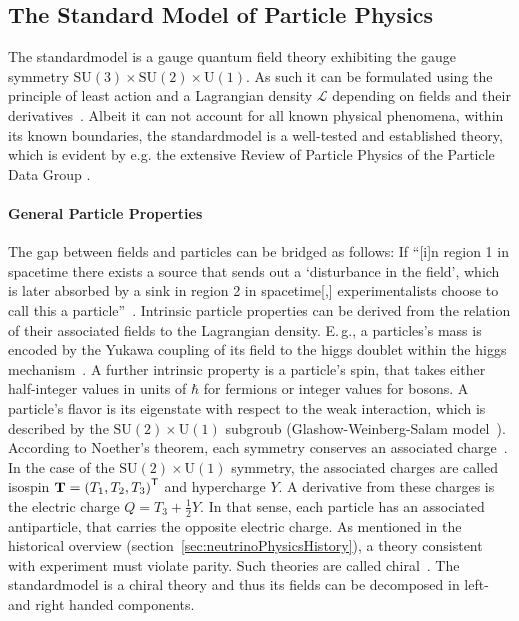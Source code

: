 \subsection{The Standard Model of Particle Physics}
\label{sec:neutrinoPhysicsStandardModelParticleProperties}
The \gls{standardmodel} is a gauge quantum field theory exhibiting the gauge symmetry $\text{SU}(3)\times\text{SU}(2)\times\text{U}(1)$. As such it can be formulated using the principle of least action and a Lagrangian density $\mathcal{L}$ depending on fields and their derivatives~\cite{zee2003quantum}. Albeit it can not account for all known physical phenomena, within its known boundaries, the \gls{standardmodel} is a well-tested and established theory, which is evident by e.g. the extensive Review of Particle Physics of the Particle Data Group \cite{ReviewOfParticlePhysics}.

\paragraph{General Particle Properties}
The gap between fields and particles can be bridged as follows: If ``[i]n region 1 in spacetime there exists a source that sends out a `disturbance in the field', which is later absorbed by a sink in region 2 in spacetime[,] experimentalists choose to call this a particle''~\cite{zee2003quantum}. Intrinsic particle properties can be derived from the relation of their associated fields to the Lagrangian density. E.\,g., a particles's mass is encoded by the Yukawa coupling of its field to the higgs doublet within the higgs mechanism~\cite{Higgs:1964pj}. A further intrinsic property is a particle's spin, that takes either half-integer values in units of $\hbar$ for fermions or integer values for bosons. A particle's flavor is its eigenstate with respect to the weak interaction, which is described by the $\text{SU}(2)\times\text{U}(1)$ subgroub (Glashow-Weinberg-Salam model~\cite{Glashow:1961,Weinberg1967,Salam:1968}). According to Noether's theorem, each symmetry conserves an associated charge~\cite{Noether1918}. In the case of the $\text{SU}(2)\times\text{U}(1)$ symmetry, the associated charges are called isospin $\boldsymbol{\mathbf{T}}={(T_1, T_2, T_3)}^{\mathsf{T}}$ and hypercharge $Y$. A derivative from these charges is the electric charge $Q=T_3+\frac{1}{2}Y$. In that sense, each particle has an associated antiparticle, that carries the opposite electric charge. As mentioned in the historical overview (section~\ref{sec:neutrinoPhysicsHistory}), a theory consistent with experiment must violate parity. Such theories are called chiral~\cite{zee2003quantum}. The \gls{standardmodel} is a chiral theory and thus its fields can be decomposed in left- and right handed components. 

